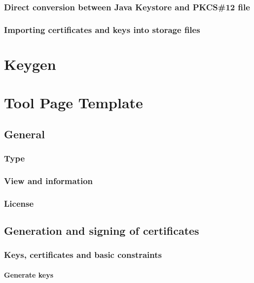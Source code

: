 \documentclass[10pt, a4paper]{report}
\begin{document}
  \subsection{Direct conversion between Java Keystore and PKCS\#12 file}
  
  \subsection{Importing certificates and keys into storage files}
  


\chapter{Keygen}




\chapter{Tool Page Template}

\section{General}

  \subsection{Type}
  
  \subsection{View and information}
  
  \subsection{License}

  
\section{Generation and signing of certificates}

  \subsection{Keys, certificates and basic constraints}
  
    \subsubsection{Generate keys}
    
\end{document}
